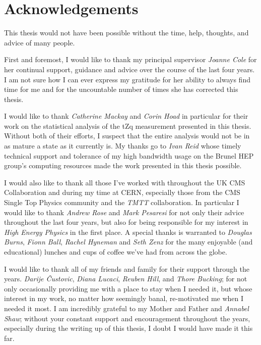 \documentclass[11pt,a4paper]{report}
\begin{document}
\clearpage
\newpage

\chapter*{Acknowledgements} \label{sec:acknowledgments}
This thesis would not have been possible without the time, help, thoughts, and advice of many people.

First and foremost, I would like to thank my principal supervisor \textit{Joanne Cole} for her continual support, guidance and advice over the course of the last four years.
I am not sure how I can ever express my gratitude for her ability to always find time for me and for the uncountable number of times she has corrected this thesis.

I would like to thank \textit{Catherine Mackay} and \textit{Corin Hoad} in particular for their work on the statistical analysis of the tZq measurement presented in this thesis.
Without both of their efforts, I suspect that the entire analysis would not be in as mature a state as it currently is.
My thanks go to \textit{Ivan Reid} whose timely technical support and tolerance of my high bandwidth usage on the Brunel HEP group's computing resources made the work presented in this thesis possible.

I would also like to thank all those I've worked with throughout the UK CMS Collaboration and during my time at CERN, especially those from the CMS Single Top Physics community and the \emph{TMTT} collaboration.
In particular I would like to thank \textit{Andrew Rose} and \textit{Mark Pesaresi} for not only their advice throughout the last four years, but also for being responsible for my interest in \emph{High Energy Physics} in the first place.
A special thanks is warranted to  \textit{Douglas Burns}, \textit{Fionn Ball}, \textit{Rachel Hyneman} and \textit{Seth Zenz} for the many enjoyable (and educational) lunches and cups of coffee we've had from across the globe.

I would like to thank all of my friends and family for their support through the years.
\textit{Darije \v{C}ustovi{c}}, \textit{Diana Lucaci}, \textit{Reuben Hill}, and \textit{Thore Bucking}; for not only occasionally providing me with a place to stay when I needed it, but whose interest in my work, no matter how seemingly banal, re-motivated me when I needed it most.
I am incredibly grateful to my Mother and Father and \textit{Annabel Shaw}; without your constant support and encouragement throughout the years, especially during the writing up of this thesis, I doubt I would have made it this far.
\end{document}
